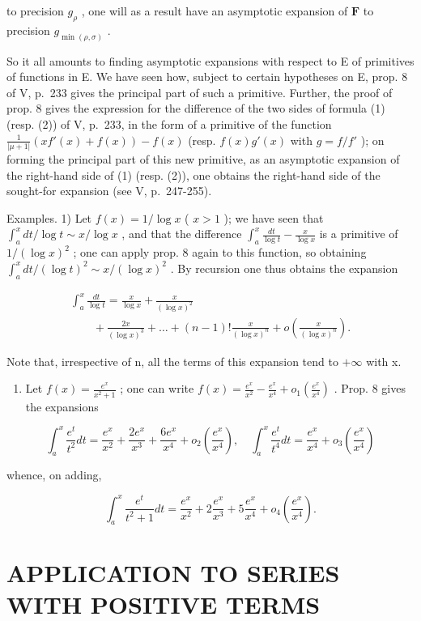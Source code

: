 to precision \(g_{\rho}\) , one will as a result have an asymptotic expansion of \(\mathbf{F}\) to precision \(g_{\min(\rho, \sigma)}\) .

So it all amounts to finding asymptotic expansions with respect to E of primitives of functions in E. We have seen how, subject to certain hypotheses on E, prop. 8 of V, p.~233 gives the principal part of such a primitive. Further, the proof of prop. 8 gives the expression for the difference of the two sides of formula (1) (resp. (2)) of V, p.~233, in the form of a primitive of the function \(\frac{1}{|\mu+1|}\left(xf'(x)+f(x)\right)-f(x)\) (resp. \(f(x)g'(x)\) with \(g=f/f'\) ); on forming the principal part of this new primitive, as an asymptotic expansion of the right-hand side of (1) (resp. (2)), one obtains the right-hand side of the sought-for expansion (see V, p.~247-255).

Examples. 1) Let \(f(x) = 1 / \log x\) ( \(x > 1\) ); we have seen that \(\int_{a}^{x} dt / \log t \sim x / \log x\) , and that the difference \(\int_{a}^{x} \frac{dt}{\log t} - \frac{x}{\log x}\) is a primitive of \(1 / (\log x)^2\) ; one can apply prop. 8 again to this function, so obtaining \(\int_{a}^{x} dt / (\log t)^2 \sim x / (\log x)^2\) . By recursion one thus obtains the expansion

\[
\begin{array}{l} \int_ {a} ^ {x} \frac {d t}{\log t} = \frac {x}{\log x} + \frac {x}{(\log x) ^ {2}} \\ \qquad + \frac {2 x}{(\log x) ^ {3}} + \dots + (n - 1)! \frac {x}{(\log x) ^ {n}} + o \left(\frac {x}{(\log x) ^ {n}}\right). \end{array}
\]

Note that, irrespective of n, all the terms of this expansion tend to \(+\infty\) with x.

\begin{enumerate}
\def\labelenumi{\arabic{enumi})}
\setcounter{enumi}{1}
\tightlist
\item
  Let \(f(x) = \frac{e^x}{x^2 + 1}\) ; one can write \(f(x) = \frac{e^x}{x^2} - \frac{e^x}{x^4} + o_1\left(\frac{e^x}{x^4}\right)\) . Prop. 8 gives the expansions
\end{enumerate}

\[
\int_ {a} ^ {x} \frac {e ^ {t}}{t ^ {2}} d t = \frac {e ^ {x}}{x ^ {2}} + \frac {2 e ^ {x}}{x ^ {3}} + \frac {6 e ^ {x}}{x ^ {4}} + o _ {2} \left(\frac {e ^ {x}}{x ^ {4}}\right), \quad \int_ {a} ^ {x} \frac {e ^ {t}}{t ^ {4}} d t = \frac {e ^ {x}}{x ^ {4}} + o _ {3} \left(\frac {e ^ {x}}{x ^ {4}}\right)
\]

whence, on adding,

\[
\int_ {a} ^ {x} \frac {e ^ {t}}{t ^ {2} + 1} d t = \frac {e ^ {x}}{x ^ {2}} + 2 \frac {e ^ {x}}{x ^ {3}} + 5 \frac {e ^ {x}}{x ^ {4}} + o _ {4} \left(\frac {e ^ {x}}{x ^ {4}}\right).
\]

\section{APPLICATION TO SERIES WITH POSITIVE TERMS}
